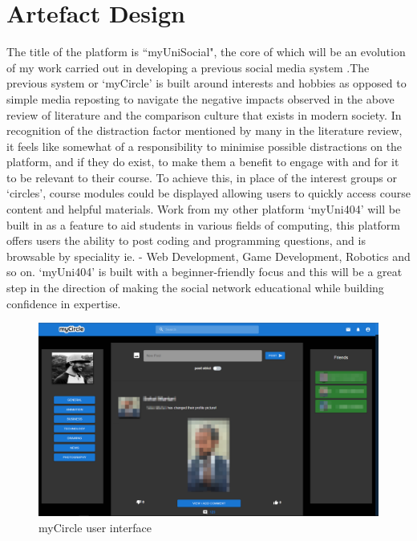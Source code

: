\documentclass[lettersize,journal]{IEEEtran}
\begin{document}
\section{Artefact Design}

	The title of the platform is ``myUniSocial", the core of which will be an evolution of my work carried out in developing a previous
	social media system \cite{Daley 2022}.The previous system or `myCircle'\cite{myCircle} is built around interests and hobbies as opposed
	to simple media reposting to navigate the negative impacts observed in the above review of literature and the comparison culture that exists in modern
	society. In recognition of the distraction factor mentioned by many in the literature review, it feels like somewhat of a responsibility
	to minimise possible distractions on the platform, and if they do exist, to make them a benefit to engage with and for it to be relevant
	to their course. To achieve this, in place of the interest groups or `circles', course modules could be displayed allowing users to
	quickly access course content and helpful materials. Work from my other
    platform `myUni404' \cite{myUni404} will be built in as a feature to aid students
	in various fields of computing, this platform offers users the ability to post coding and programming questions, and is browsable by speciality
	ie. -  Web Development, Game Development, Robotics and so on. `myUni404' is built with a beginner-friendly focus and this will be a great
	step in the direction of making the social network educational while building confidence in expertise.


	\begin{figure}[h!]
		\includegraphics[width=\linewidth]{myCircle.PNG}
		\caption{myCircle user interface}
		\label{figure 1}
	\end{figure}
\end{document}
